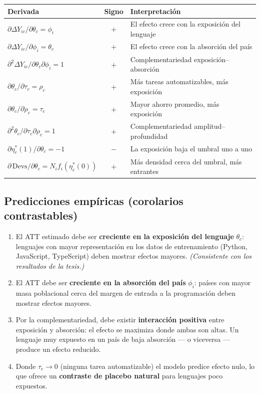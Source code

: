 \documentclass[11pt,a4paper]{article}
\begin{document}
\renewcommand{\arraystretch}{1.3}
\begin{center}
\small
\begin{tabular}{lcl}
\toprule
\textbf{Derivada} & \textbf{Signo} & \textbf{Interpretación} \\
\midrule
$\partial \Delta Y_{ic}/\partial \theta_c=\phi_i$ & $+$ & El efecto crece con la exposición del lenguaje \\
$\partial \Delta Y_{ic}/\partial \phi_i=\theta_c$ & $+$ & El efecto crece con la absorción del país \\
$\partial^2 \Delta Y_{ic}/\partial\theta_c\partial\phi_i=1$ & $+$ & Complementariedad exposición--absorción \\
$\partial \theta_c/\partial \tau_c=\rho_c$ & $+$ & Más tareas automatizables, más exposición \\
$\partial \theta_c/\partial \rho_c=\tau_c$ & $+$ & Mayor ahorro promedio, más exposición \\
$\partial^2 \theta_c/\partial\tau_c\partial\rho_c=1$ & $+$ & Complementariedad amplitud--profundidad \\
$\partial \eta_c^*(1)/\partial \theta_c=-1$ & $-$ & La exposición baja el umbral uno a uno \\
$\partial\,\mathrm{Devs}/\partial \theta_c=N_i f_i(\eta_c^*(0))$ & $+$ & Más densidad cerca del umbral, más entrantes \\
\bottomrule
\end{tabular}
\end{center}

\subsection{Predicciones empíricas (corolarios contrastables)}

\begin{enumerate}[leftmargin=1.6em,itemsep=0.25em]
  \item El ATT estimado debe ser \textbf{creciente en la exposición del lenguaje} $\theta_c$: lenguajes con mayor representación en los datos de entrenamiento (Python, JavaScript, TypeScript) deben mostrar efectos mayores. \textit{(Consistente con los resultados de la tesis.)}
  \item El ATT debe ser \textbf{creciente en la absorción del país} $\phi_i$: países con mayor masa poblacional cerca del margen de entrada a la programación deben mostrar efectos mayores.
  \item Por la complementariedad, debe existir \textbf{interacción positiva} entre exposición y absorción: el efecto se maximiza donde ambas son altas. Un lenguaje muy expuesto en un país de baja absorción --- o viceversa --- produce un efecto reducido.
  \item Donde $\tau_c\to 0$ (ninguna tarea automatizable) el modelo predice efecto nulo, lo que ofrece un \textbf{contraste de placebo natural} para lenguajes poco expuestos.
\end{enumerate}
\end{document}
